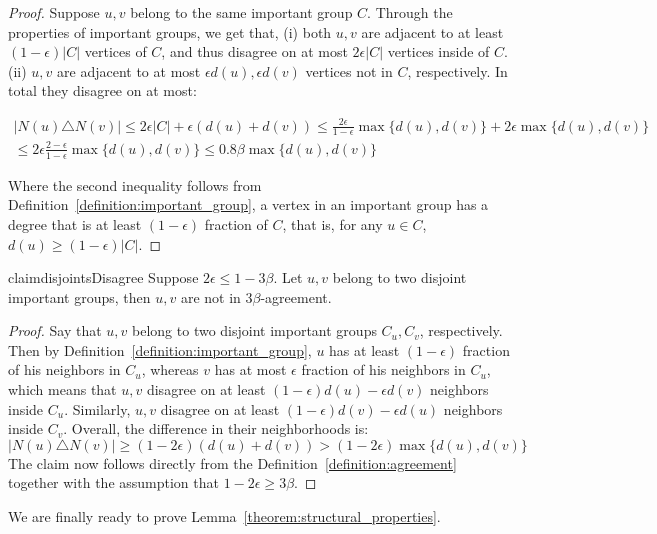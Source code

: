 \documentclass{article}
\begin{document}
\begin{proof}
Suppose $u,v$ belong to the same important group $C$. Through the properties of important groups, we get that, (i) both $u,v$ are adjacent to at least $(1-\epsilon)|C|$ vertices of $C$, and thus disagree on at most $2\epsilon|C|$ vertices inside of $C$. (ii) $u,v$ are adjacent to at most $\epsilon d(u), \epsilon d(v)$ vertices not in $C$, respectively.  In total they disagree on at most:

\begin{multline*}
    |N(u) \triangle N(v)| \leq 2\epsilon|C| + \epsilon(d(u)+d(v))
    \leq \frac{2\epsilon}{1-\epsilon} \max\{d(u), d(v)\} + 2\epsilon \max\{d(u), d(v)\} \\
    \leq 2\epsilon \frac{2-\epsilon}{1-\epsilon} \max\{d(u), d(v)\}
    \leq 0.8\beta \max\{d(u), d(v)\}
\end{multline*}

\noindent Where the second inequality follows from
Definition~\ref{definition:important_group}, a vertex in an important group has a degree that is at least $(1-\epsilon)$ fraction of $C$, that is, for any $u \in C$, $d(u) \geq (1-\epsilon)|C|$.
\end{proof}

\begin{restatable}{claim}{disjointsDisagree}
\label{claim:disjoints_disagree}
    Suppose $2\epsilon \leq 1-3\beta$. Let $u, v$ belong to two disjoint important groups, then $u, v$ are not in $3\beta$-agreement.
\end{restatable}

\begin{proof}
Say that $u, v$ belong to two disjoint important groups $C_u, C_v$, respectively. Then by Definition~\ref{definition:important_group}, $u$ has at least $(1-\epsilon)$ fraction of his neighbors in $C_u$, whereas $v$ has at most $\epsilon$ fraction of his neighbors in $C_u$, which means that $u, v$ disagree on at least $(1-\epsilon)d(u)-\epsilon d(v)$ neighbors inside $C_u$. Similarly, $u, v$ disagree on at least $(1-\epsilon)d(v)-\epsilon d(u)$ neighbors inside $C_v$. Overall, the difference in their neighborhoods is:
\[
|N(u)\triangle N(v)|
\geq (1-2\epsilon)(d(u)+d(v)) > (1-2\epsilon) \max \{ d(u), d(v) \}
\]
The claim now follows directly from the Definition~\ref{definition:agreement} together with the assumption that $1-2\epsilon \geq 3\beta$.
\end{proof}

We are finally ready to prove Lemma~\ref{theorem:structural_properties}.
\end{document}
